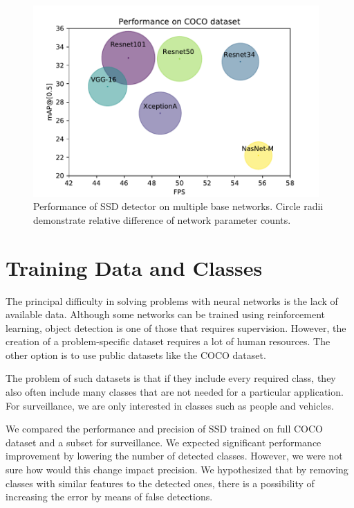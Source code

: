 \begin{figure}
    \centering
    \includegraphics[width=0.975\textwidth]{img/fps_map_c}
    \caption[Performance of SSD with multiple base networks on COCO dataset]{Performance of SSD detector on multiple base networks. Circle radii demonstrate relative difference of network parameter counts. }
    \label{fig:cocoperf}
\end{figure}

\section{Training Data and Classes}
The principal difficulty in solving problems with neural networks is the lack of available data. Although some networks can be trained using reinforcement learning, object detection is one of those that requires supervision. However, the creation of a problem-specific dataset requires a lot of human resources. The other option is to use public datasets like the COCO dataset. 

The problem of such datasets is that if they include every required class, they also often include many classes that are not needed for a particular application. For surveillance, we are only interested in classes such as people and vehicles. 

We compared the performance and precision of SSD trained on full COCO dataset and a subset for surveillance. We expected significant performance improvement by lowering the number of detected classes. However, we were not sure how would this change impact precision. We hypothesized that by removing classes with similar features to the detected ones, there is a possibility of increasing the error by means of false detections.

